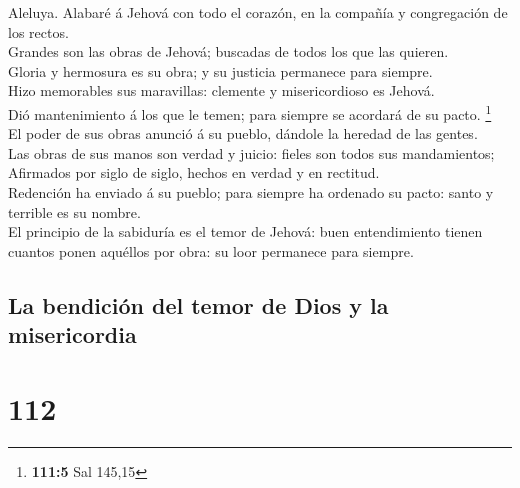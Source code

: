  Aleluya. Alabaré á Jehová con todo el corazón, en la
compañía y congregación de los rectos.\\
 Grandes son las obras de Jehová; buscadas de todos los
que las quieren.\\
 Gloria y hermosura es su obra; y su justicia permanece
para siempre.\\
 Hizo memorables sus maravillas: clemente y misericordioso
es Jehová.\\
 Dió mantenimiento á los que le temen; para siempre se
acordará de su pacto. \footnote{\textbf{111:5} Sal 145,15}\\
 El poder de sus obras anunció á su pueblo, dándole la
heredad de las gentes.\\
 Las obras de sus manos son verdad y juicio: fieles son
todos sus mandamientos;\\
 Afirmados por siglo de siglo, hechos en verdad y en
rectitud.\\
 Redención ha enviado á su pueblo; para siempre ha
ordenado su pacto: santo y terrible es su nombre.\\
 El principio de la sabiduría es el temor de Jehová: buen
entendimiento tienen cuantos ponen aquéllos por obra: su loor permanece
para siempre.

\hypertarget{la-bendiciuxf3n-del-temor-de-dios-y-la-misericordia}{%
\subsection{La bendición del temor de Dios y la
misericordia}\label{la-bendiciuxf3n-del-temor-de-dios-y-la-misericordia}}

\hypertarget{section-111}{%
\section{112}\label{section-111}}

